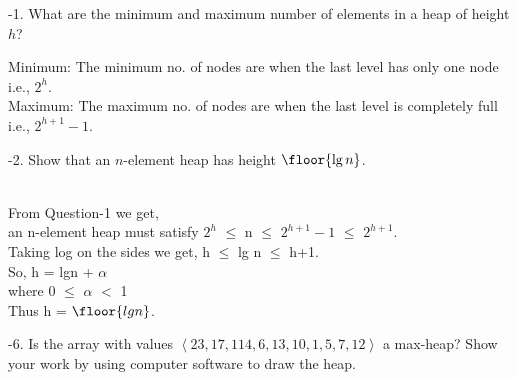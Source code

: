 \documentclass[addpoints,11pt]{exam}
\begin{document}
	
	\begin{questions}
		-1.  What are the minimum and maximum number of elements in a heap of height $h$?
		
		\begin{solutionorbox}
			Minimum: The minimum no. of nodes are when the last level has only one node i.e., $2^h$.\\
			Maximum: The maximum no. of nodes are when the last level is completely full i.e., $2^{h+1}-1$.
		\end{solutionorbox}
		
		\ifprintanswers
		\newpage
		\else
		\bigskip
		\fi
		
		
		-2.  Show that an $n$-element heap has height $\floor{\lg n}$.
		
		\begin{solutionorbox}\\
			From Question-1 we get,\\
			an n-element heap must satisfy $2^h$ $\leq$ n $\leq$ $2^{h+1}-1$ $\leq$ $2^{h+1}$.\\
			Taking log on the sides we get, h $\leq$ lg n $\leq$ h+1.\\
			So, h = lgn + $\alpha$ \\
			where 0 $\leq$ $\alpha$ $<$ 1 \\
			Thus h = $\floor{lg n}$.
		\end{solutionorbox}
		\ifprintanswers
		\newpage
		\else
		\bigskip
		\fi
		
		
		-6.  Is the array with values $\left<23, 17, 114, 6, 13, 10, 1, 5, 7, 12\right>$ a max-heap?  Show your work by using computer software to draw the heap.
		

\end{questions}
\end{document}
